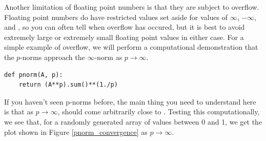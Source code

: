 Another limitation of floating point numbers is that they are subject to overflow.
Floating point numbers do have restricted values set aside for values of $\infty$, $-\infty$, and , so you can often tell when overflow has occured, but it is best to avoid extremely large or extremely small floating point values in either case.
For a simple example of overflow, we will perform a computational demonstration that the $p$-norms approach the $\infty$-norm as $p \rightarrow \infty$.
\begin{lstlisting}
def pnorm(A, p):
    return (A**p).sum()**(1./p)
\end{lstlisting}
If you haven't seen p-norms before, the main thing you need to understand here is that as $p \rightarrow \infty$,  should come arbitrarily close to .
Testing this computationally, we see that, for a randomly generated array of values between 0 and 1, we get the plot shown in Figure \ref{pnorm_convergence} as $p \rightarrow \infty$.

